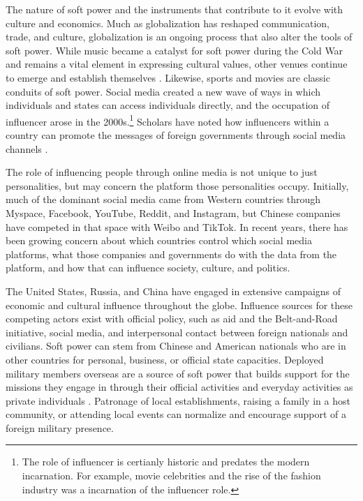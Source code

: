 The nature of soft power and the instruments that contribute to it evolve with culture and economics. Much as globalization has reshaped communication, trade, and culture, globalization is an ongoing process that also alter the tools of soft power. While music became a catalyst for soft power during the Cold War and remains a vital element in expressing cultural values, other venues continue to emerge and establish themselves \cite{nye2004}. Likewise, sports and movies are classic conduits of soft power\cite{sari2012,grix2014}. Social media created a new wave of ways in which individuals and states can access individuals directly, and the occupation of influencer arose in the 2000s.\footnote{The role of influencer is certianly historic and predates the modern incarnation. For example, movie celebrities and the rise of the fashion industry was a incarnation of the influencer role.} Scholars have noted how influencers within a country can promote the messages of foreign governments through social media channels \cite{vibber2021}. 

The role of influencing people through online media is not unique to just personalities, but may concern the platform those personalities occupy. Initially, much of the dominant social media came from Western countries through Myspace, Facebook, YouTube, Reddit, and Instagram, but Chinese companies have competed in that space with Weibo and TikTok. In recent years, there has been growing concern about which countries control which social media platforms, what those companies and governments do with the data from the platform, and how that can influence society, culture, and politics.  

The United States, Russia, and China have engaged in extensive campaigns of economic and cultural influence throughout the globe. Influence sources for these competing actors exist with official policy, such as aid and the Belt-and-Road initiative, social media, and interpersonal contact between foreign nationals and civilians. Soft power can stem from Chinese and American nationals who are in other countries for personal, business, or official state capacities. Deployed military members overseas are a source of soft power that builds support for the missions they engage in through their official activities and everyday activities as private individuals \cite{atkinson2014,allen2023}. Patronage of local establishments, raising a family in a host community, or attending local events can normalize and encourage support of a foreign military presence. 

